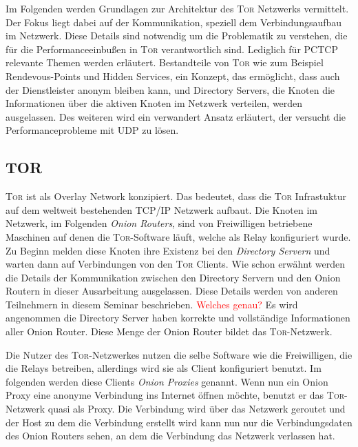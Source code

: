 \documentclass[fleqn,envcountsame,runningheads,10pt,a4paper]{llncs}
\begin{document}
Im Folgenden werden Grundlagen zur Architektur des \textsc{Tor} Netzwerks vermittelt. Der Fokus liegt dabei auf der Kommunikation, speziell dem Verbindungsaufbau im Netzwerk. Diese Details sind notwendig um die Problematik zu verstehen, die für die Performanceeinbußen in \textsc{Tor} verantwortlich sind. Lediglich für PCTCP relevante Themen werden erläutert. Bestandteile von \textsc{Tor} wie zum Beispiel Rendevous-Points und Hidden Services, ein Konzept, das ermöglicht, dass auch der Dienstleister anonym bleiben kann, und Directory Servers, die Knoten die Informationen über die aktiven Knoten im Netzwerk verteilen, werden ausgelassen. Des weiteren wird ein verwandert Ansatz erläutert, der versucht die Performanceprobleme mit UDP zu lösen.

\subsection{TOR}
\label{sec:tor}


\textsc{Tor} ist als Overlay Network konzipiert. Das bedeutet, dass die \textsc{Tor} Infrastuktur auf dem weltweit bestehenden TCP/IP Netzwerk aufbaut. Die Knoten im Netzwerk, im Folgenden \textit{Onion Routers}, sind von Freiwilligen betriebene Maschinen auf denen die  \textsc{Tor}-Software läuft, welche als Relay konfiguriert wurde. Zu Beginn melden diese Knoten ihre Existenz bei den \textit{Directory Servern} und warten dann auf Verbindungen von den \textsc{Tor} Clients. Wie schon erwähnt werden die Details der Kommunikation zwischen den Directory Servern und den Onion Routern in dieser Ausarbeitung ausgelassen. Diese Details werden von anderen Teilnehmern in diesem Seminar beschrieben. \textcolor{red}{Welches genau?} Es wird angenommen die Directory Server haben korrekte und vollständige Informationen aller Onion Router. Diese Menge der Onion Router bildet das \textsc{Tor}-Netzwerk.

Die Nutzer des \textsc{Tor}-Netzwerkes nutzen die selbe Software wie die Freiwilligen, die die Relays betreiben, allerdings wird sie als Client konfiguriert benutzt. Im folgenden werden diese Clients \textit{Onion Proxies} genannt. Wenn nun ein Onion Proxy eine anonyme Verbindung ins Internet öffnen möchte, benutzt er das \textsc{Tor}-Netzwerk quasi als Proxy. Die Verbindung wird über das Netzwerk geroutet und der Host zu dem die Verbindung erstellt wird kann nun nur die Verbindungsdaten des Onion Routers sehen, an dem die Verbindung das Netzwerk verlassen hat.\\
\end{document}
